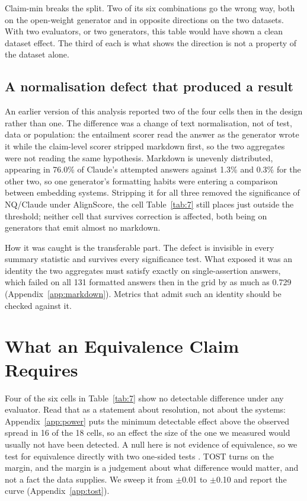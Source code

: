 \documentclass[11pt]{article}
\begin{document}
Claim-min breaks the split. Two of its six combinations go the wrong way, both on the open-weight generator and in opposite directions on the two datasets. With two evaluators, or two generators, this table would have shown a clean dataset effect. The third of each is what shows the direction is not a property of the dataset alone.


\subsection{A normalisation defect that produced a result}
\label{sec:normalisation}

An earlier version of this analysis reported two of the four cells then in the design rather than one. The difference was a change of text normalisation, not of test, data or population: the entailment scorer read the answer as the generator wrote it while the claim-level scorer stripped markdown first, so the two aggregates were not reading the same hypothesis. Markdown is unevenly distributed, appearing in 76.0\% of Claude's attempted answers against 1.3\% and 0.3\% for the other two, so one generator's formatting habits were entering a comparison between embedding systems. Stripping it for all three removed the significance of NQ/Claude under AlignScore, the cell Table~\ref{tab:7} still places just outside the threshold; neither cell that survives correction is affected, both being on generators that emit almost no markdown.

How it was caught is the transferable part. The defect is invisible in every summary statistic and survives every significance test. What exposed it was an identity the two aggregates must satisfy exactly on single-assertion answers, which failed on all 131 formatted answers then in the grid by as much as 0.729 (Appendix~\ref{app:markdown}). Metrics that admit such an identity should be checked against it.



\section{What an Equivalence Claim Requires}
\label{sec:equivalence}

Four of the six cells in Table~\ref{tab:7} show no detectable difference under any evaluator. Read that as a statement about resolution, not about the systems: Appendix~\ref{app:power} puts the minimum detectable effect above the observed spread in 16 of the 18 cells, so an effect the size of the one we measured would usually not have been detected. A null here is not evidence of equivalence, so we test for equivalence directly with two one-sided tests \citep{schuirmann-1987}. TOST turns on the margin, and the margin is a judgement about what difference would matter, and not a fact the data supplies. We sweep it from $\pm$0.01 to $\pm$0.10 and report the curve (Appendix~\ref{app:tost}).
\end{document}
